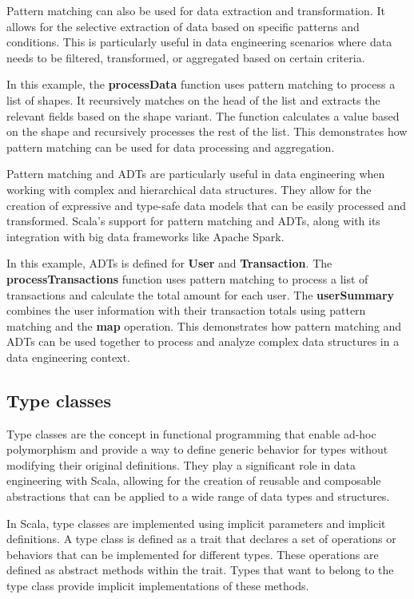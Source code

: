 Pattern matching can also be used for data extraction and transformation. It allows for the selective extraction of data based on specific patterns and conditions. This is particularly useful in data engineering scenarios where data needs to be filtered, transformed, or aggregated based on certain criteria.



In this example, the \textbf{processData} function uses pattern matching to process a list of shapes. It recursively matches on the head of the list and extracts the relevant fields based on the shape variant. The function calculates a value based on the shape and recursively processes the rest of the list. This demonstrates how pattern matching can be used for data processing and aggregation.

Pattern matching and ADTs are particularly useful in data engineering when working with complex and hierarchical data structures. They allow for the creation of expressive and type-safe data models that can be easily processed and transformed. Scala's support for pattern matching and ADTs, along with its integration with big data frameworks like Apache Spark.



In this example, ADTs is defined for \textbf{User} and \textbf{Transaction}. The \textbf{processTransactions} function uses pattern matching to process a list of transactions and calculate the total amount for each user. The \textbf{userSummary} combines the user information with their transaction totals using pattern matching and the \textbf{map} operation. This demonstrates how pattern matching and ADTs can be used together to process and analyze complex data structures in a data engineering context.

\subsection{Type classes}

Type classes are the concept in functional programming that enable ad-hoc polymorphism and provide a way to define generic behavior for types without modifying their original definitions. They play a significant role in data engineering with Scala, allowing for the creation of reusable and composable abstractions that can be applied to a wide range of data types and structures.

In Scala, type classes are implemented using implicit parameters and implicit definitions. A type class is defined as a trait that declares a set of operations or behaviors that can be implemented for different types. These operations are defined as abstract methods within the trait. Types that want to belong to the type class provide implicit implementations of these methods.

